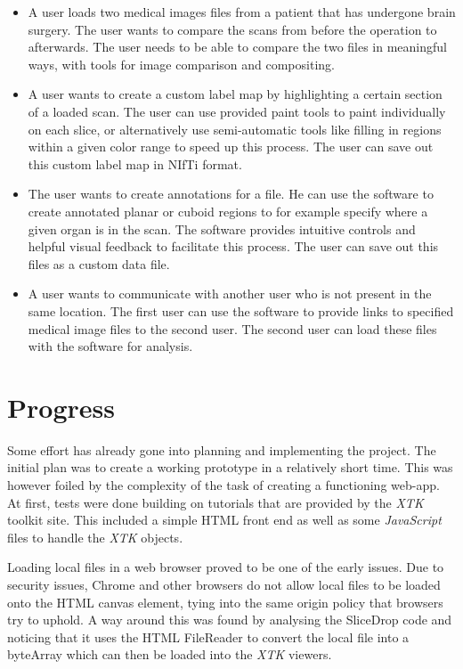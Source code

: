 \documentclass[a4paper,11pt,titlepage]{article}
\begin{document}
\begin{itemize}

\item A user loads two medical images files from a patient that has undergone brain surgery. The user wants to compare the scans from before the operation to afterwards. The user needs to be able to compare the two files in meaningful ways, with tools for image comparison and compositing.

\item A user wants to create a custom label map by highlighting a certain section of a loaded scan. The user can use provided paint tools to paint individually on each slice, or alternatively use semi-automatic tools like filling in regions within a given color range to speed up this process. The user can save out this custom label map in NIfTi format.

\item The user wants to create annotations for a file. He can use the software to create annotated planar or cuboid regions to for example specify where a given organ is in the scan. The software provides intuitive controls and helpful visual feedback to facilitate this process. The user can save out this files as a custom data file.

\item A user wants to communicate with another user who is not present in the same location. The first user can use the software to provide links to specified medical image files to the second user. The second user can load these files with the software for analysis.

\end{itemize}

\section{Progress}

Some effort has already gone into planning and implementing the project. The initial plan was to create a working prototype in a relatively short time. This was however foiled by the complexity of the task of creating a functioning web-app. At first, tests were done building on tutorials that are provided by the \textit{XTK} toolkit site. This included a simple HTML front end as well as some \textit{JavaScript} files to handle the \textit{XTK} objects.

Loading local files in a web browser proved to be one of the early issues. Due to security issues, Chrome and other browsers do not allow local files to be loaded onto the HTML canvas element, tying into the same origin policy that browsers try to uphold. A way around this was found by analysing the SliceDrop code and noticing that it uses the HTML FileReader to convert the local file into a byteArray which can then be loaded into the \textit{XTK} viewers.
\end{document}
